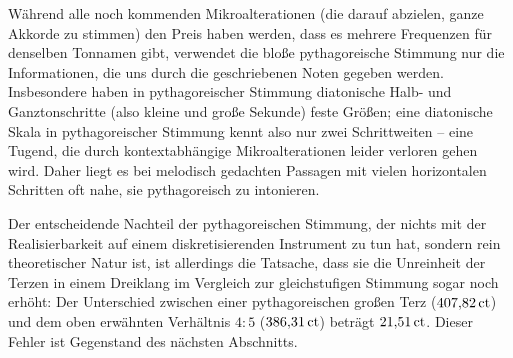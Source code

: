 Während alle noch kommenden Mikroalterationen (die darauf abzielen, ganze
Akkorde zu stimmen) den Preis haben werden, dass es mehrere Frequenzen für
denselben Tonnamen gibt, verwendet die bloße pythagoreische Stimmung nur die
Informationen, die uns durch die geschriebenen Noten gegeben werden.
Insbesondere haben in pythagoreischer Stimmung diatonische Halb- und
Ganztonschritte (also kleine und große Sekunde) feste Größen; eine diatonische
Skala in pythagoreischer Stimmung kennt also nur zwei Schrittweiten – eine
Tugend, die durch kontextabhängige Mikroalterationen leider verloren gehen wird.
Daher liegt es bei melodisch gedachten Passagen mit vielen horizontalen
Schritten oft nahe, sie pythagoreisch zu intonieren.

Der entscheidende Nachteil der pythagoreischen Stimmung, der nichts mit der
Realisierbarkeit auf einem diskretisierenden Instrument zu tun hat, sondern rein
theoretischer Natur ist, ist allerdings die Tatsache, dass sie die Unreinheit
der Terzen in einem Dreiklang im Vergleich zur gleichstufigen Stimmung sogar
noch erhöht: Der Unterschied zwischen einer pythagoreischen großen Terz
($407{,}82\,\mathrm{ct}$) und dem oben erwähnten Verhältnis $4:5$
($386{,}31\,\mathrm{ct}$) beträgt $21{,}51\,\mathrm{ct}$. Dieser Fehler ist Gegenstand
des nächsten Abschnitts.

